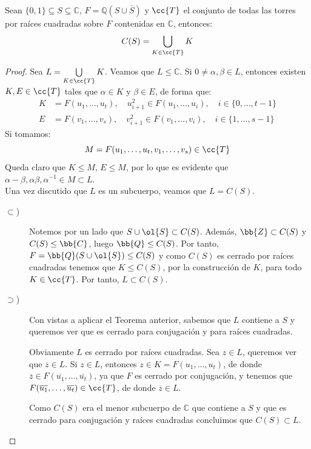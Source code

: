 \begin{teo}\label{teo:torres_raices}
    Sean $\{0,1\}\subseteq S\subseteq \mathbb{C}$, $F = \mathbb{Q}(S\cup \overline{S})$ y $\cc{T}$ el conjunto de todas las torres por raíces cuadradas sobre $F$ contenidas en $\mathbb{C}$, entonces:
    \begin{equation*}
        C(S) = \bigcup_{K\in \cc{T}}K
    \end{equation*}
    \begin{proof}
        Sea $L = \bigcup\limits_{K\in \cc{T}}K$. Veamos que $L\leq \mathbb{C}$. Si $0\neq\alpha,\beta\in L$, entonces existen $K,E\in \cc{T}$ tales que $\alpha\in K$ y $\beta\in E$, de forma que:
        \begin{align*}
            K &= F(u_1, \ldots, u_t),\quad  u_{i+1}^2 \in F(u_1, \ldots, u_i), \quad i \in \{0,\ldots,t-1\} \\
            E &= F(v_1, \ldots, v_s),\quad  v_{i+1}^2 \in F(v_1, \ldots, v_i), \quad i \in \{1,\ldots, s-1\}
        \end{align*}
        Si tomamos:
        \begin{equation*}
            M = F(u_1,\ldots,u_t, v_1,\ldots,v_s) \in \cc{T}
        \end{equation*}
        Queda claro que $K\leq M$, $E\leq M$, por lo que es evidente que $\alpha-\beta,\alpha\beta, \alpha^{-1}\in M\subset L$.\\

        \noindent
        Una vez discutido que $L$ es un subcuerpo, veamos que $L= C(S)$.
        \begin{description}
            \item[$\subset$)] Notemos por un lado que $S\cup \ol{S}\subset C(S)$. Además, $\bb{Z}\subset C(S)$ y $C(S)\leq \bb{C}$, luego $\bb{Q}\leq C(S)$. Por tanto, $F=\bb{Q}(S\cup \ol{S})\leq C(S)$ y como $C(S)$ es cerrado por raíces cuadradas tenemos que $K\leq C(S)$, por la construcción de $K$, para todo $K\in \cc{T}$. Por tanto, $L\subset C(S)$.
            \item[$\supset$)] Con vistas a aplicar el Teorema anterior, sabemos que $L$ contiene a $S$ y queremos ver que es cerrado para conjugación y para raíces cuadradas.
            
            Obviamente $L$ es cerrado por raíces cuadradas. Sea $z\in L$, queremos ver que $\overline{z}\in L$. Si $z\in L$, entonces $z\in K=F(u_1,\ldots,u_t)$, de donde $\overline{z}\in F(\overline{u_1},\ldots,\overline{u_t})$, ya que $F$ es cerrado por conjugación, y tenemos que $F(\overline{u_1},\ldots,\overline{u_t})\in \cc{T}$, de donde $\overline{z}\in L$.

            Como $C(S)$ era el menor subcuerpo de $\mathbb{C}$ que contiene a $S$ y que es cerrado para conjugación y raíces cuadradas concluimos que $C(S)\subset L$.\qedhere
        \end{description}
    \end{proof}
\end{teo}

